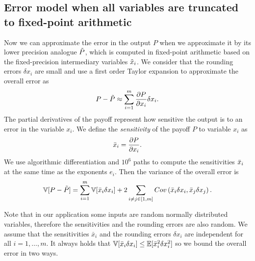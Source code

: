 \subsection{Error model when all variables are truncated to fixed-point arithmetic}
Now we can approximate the error in 
the output $P$ when we approximate it by its lower precision analogue $\Tilde{P}$, which is computed in fixed-point arithmetic based on the fixed-precision intermediary variables $\Tilde{x}_i$. 
We consider that the rounding errors $\delta x_i$ are small and use a first order Taylor expansion to approximate the overall error as
\begin{equation}
    P- \Tilde{P}  \approx \sum_{i=1}^m \frac{\partial P}{\partial x_i} \delta x_i.
\end{equation} 
The partial derivatives of the payoff represent how sensitive the output is to an error in the variable $x_i$. We define the \textit{sensitivity} of the payoff $P$ to variable $x_i$ as
\begin{equation}
    \Bar{x}_i = \frac{\partial P}{\partial x_i}. %
\end{equation}
We use algorithmic differentiation \cite{unifying-bwoptim,bitwidth-AD,ADAPT} and $10^6$ paths to compute the sensitivities $\Bar{x}_i$ at the same time as the exponents $e_i$.
Then the variance of the overall error is
\begin{equation} \label{overall_var}
    \mathbb{V}[P- \Tilde{P}] = \sum_{i=1}^m \mathbb{V}[\Bar{x}_i\delta x_i] + 2 \sum_{i\ne j\in[1,m]} Cov\left(\Bar{x}_i\delta x_i,\Bar{x}_j\delta x_j\right).
\end{equation}

Note that in our application some inputs are random normally distributed variables, therefore the sensitivities and the rounding errors are also random. We assume that the sensitivities $\bar{x}_i$ and the rounding errors $\delta x_i$ are independent for all $i=1,\ldots, m$. It always holds that $\mathbb{V}[\Bar{x}_i \delta x_i] \leq \mathbb{E}[\Bar{x}_i^2 \delta x_i^2]$ so we bound the overall error  in two ways.


